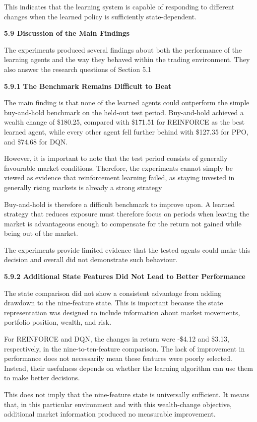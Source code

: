 This indicates that the learning system is capable of responding to
different changes when the learned policy is sufficiently
state-dependent.

\textbf{5.9 Discussion of the Main Findings}

The experiments produced several findings about both the performance of
the learning agents and the way they behaved within the trading
environment. They also answer the research questions of Section 5.1

\textbf{5.9.1 The Benchmark Remains Difficult to Beat}

The main finding is that none of the learned agents could outperform the
simple buy-and-hold benchmark on the held-out test period. Buy-and-hold
achieved a wealth change of \$180.25, compared with \$171.51 for
REINFORCE as the best learned agent, while every other agent fell
further behind with \$127.35 for PPO, and \$74.68 for DQN.

However, it is important to note that the test period consists of
generally favourable market conditions. Therefore, the experiments
cannot simply be viewed as evidence that reinforcement learning failed,
as staying invested in generally rising markets is already a strong
strategy

Buy-and-hold is therefore a difficult benchmark to improve upon. A
learned strategy that reduces exposure must therefore focus on periods
when leaving the market is advantageous enough to compensate for the
return not gained while being out of the market.

The experiments provide limited evidence that the tested agents could
make this decision and overall did not demonstrate such behaviour.

\textbf{5.9.2 Additional State Features Did Not Lead to Better
Performance}

The state comparison did not show a consistent advantage from adding
drawdown to the nine-feature state. This is important because the state
representation was designed to include information about market
movements, portfolio position, wealth, and risk.

For REINFORCE and DQN, the changes in return were -\$4.12 and \$3.13,
respectively, in the nine-to-ten-feature comparison. The lack of
improvement in performance does not necessarily mean these features were
poorly selected. Instead, their usefulness depends on whether the
learning algorithm can use them to make better decisions.

This does not imply that the nine-feature state is universally
sufficient. It means that, in this particular environment and with this
wealth-change objective, additional market information produced no
measurable improvement.

